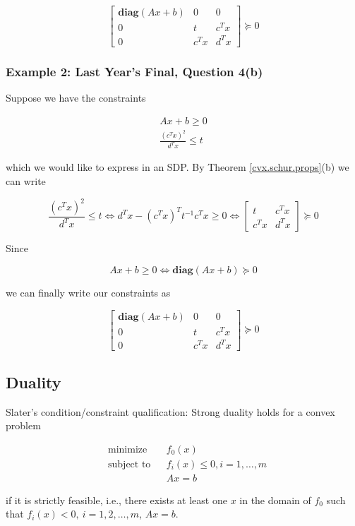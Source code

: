 \[
\begin{bmatrix}
    \textbf{diag}(Ax + b) & 0 & 0 \\
    0 & t      & c^Tx \\
    0 & c^Tx & d^Tx
\end{bmatrix} \succeq 0 
\]

\subsubsection{Example 2: Last Year's Final, Question 4(b)}

Suppose we have the constraints

\[
\begin{aligned}
Ax + b \geq 0 \\
\frac{(c^Tx)^2}{d^Tx} \leq t
\end{aligned}
\]

which we would like to express in an SDP. By Theorem \ref{cvx.schur.props}(b) we can write

\[
\frac{(c^Tx)^2}{d^Tx} \leq t \iff d^Tx - (c^Tx)^T t^{-1} c^Tx \geq 0  \iff  \begin{bmatrix}
    t      & c^Tx \\
    c^Tx & d^Tx
\end{bmatrix} \succeq 0 
\]

Since

\[
Ax + b \geq 0 \iff \textbf{diag}(Ax + b) \succeq 0
\]

we can finally write our constraints as 

\[
\begin{bmatrix}
    \textbf{diag}(Ax + b) & 0 & 0 \\
    0 & t      & c^Tx \\
    0 & c^Tx & d^Tx
\end{bmatrix} \succeq 0 
\]


\subsection{Duality}

\begin{theorem} \label{cvx.slater.thm} Slater's condition/constraint qualification: Strong duality holds for a convex problem

\[
\begin{aligned}
& {\text{minimize}}
& & f_0(x) \\
& \text{subject to}
& & f_i(x) \leq 0, i = 1, \ldots, m \\
& & & Ax = b
\end{aligned}
\]

if it is strictly feasible, i.e., there exists at least one \(x\) in the domain of \(f_0\) such that \(f_i(x) < 0, \ i=1,2, \ldots, m\), \(Ax=b\).

\end{theorem}

